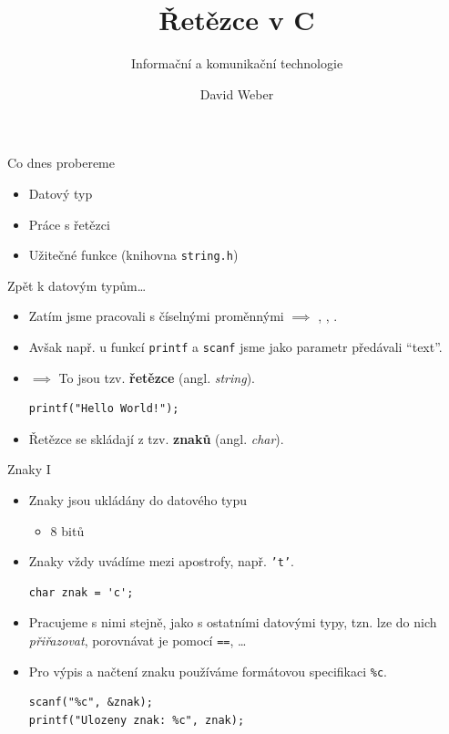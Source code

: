 \documentclass[14pt,aspectratio=169]{beamer}
\title{Řetězce v C}
\subtitle{Informační a komunikační technologie}
\author{David Weber}
\begin{document}

    \begin{frame}
        \titlepage
    \end{frame}

    \begin{frame}[t]{Co dnes probereme}
        \begin{itemize}
            \item Datový typ 
            \item Práce s řetězci
            \item Užitečné funkce (knihovna \texttt{string.h})
        \end{itemize}
    \end{frame}

    \begin{frame}[t,fragile]{Zpět k datovým typům\dots}
        \begin{itemize}
            \item Zatím jsme pracovali s číselnými proměnnými $\implies$ , , .
            \item Avšak např. u funkcí \texttt{printf} a \texttt{scanf} jsme jako parametr předávali ``text''.
            \item $\implies$ To jsou tzv. \textbf{řetězce} (angl. \emph{string}).
            \begin{lstlisting}
printf("Hello World!");
            \end{lstlisting}
            \item Řetězce se skládají z tzv. \textbf{znaků} (angl. \emph{char}).
        \end{itemize}
    \end{frame}

    \begin{frame}[t,fragile]{Znaky \textrm{I}}
        \begin{itemize}
            \item Znaky jsou ukládány do datového typu 
            \begin{itemize}
                \item 8 bitů
            \end{itemize}
            \item Znaky vždy uvádíme mezi apostrofy, např. \texttt{'t'}.
            \begin{lstlisting}
char znak = 'c';
            \end{lstlisting}
            \item Pracujeme s nimi stejně, jako s ostatními datovými typy, tzn. lze do nich \emph{přiřazovat}, porovnávat je pomocí \texttt{==}, \dots
            \item Pro výpis a načtení znaku používáme formátovou specifikaci \texttt{\%c}.
            \begin{lstlisting}
scanf("%c", &znak);
printf("Ulozeny znak: %c", znak);
            \end{lstlisting}
        \end{itemize}
    \end{frame}
\end{document}

